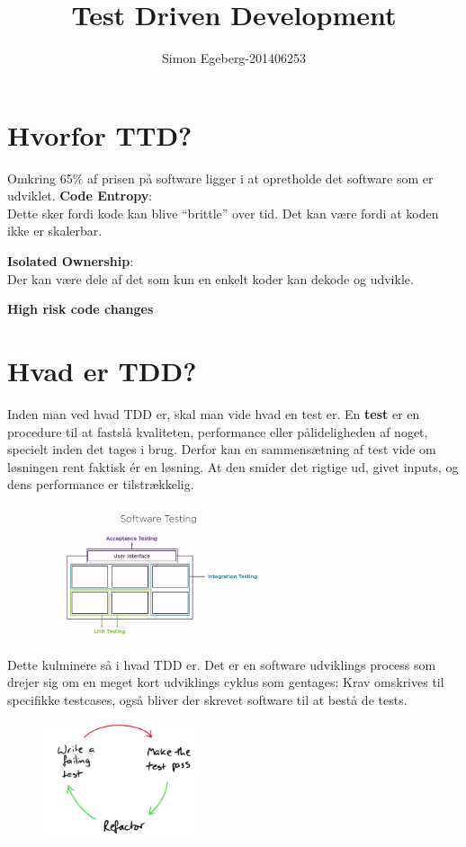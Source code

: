 \documentclass{article}
\title{Test Driven Development}
\author{Simon Egeberg-201406253}
\begin{document}
\maketitle
\section{Hvorfor TTD?}
Omkring 65\% af prisen på software ligger i at opretholde det software som er udviklet.
\textbf{Code Entropy}:\\
Dette sker fordi kode kan blive ``brittle'' over tid. Det kan være fordi at koden ikke er skalerbar.

\textbf{Isolated Ownership}:\\
Der kan være dele af det som kun en enkelt koder kan dekode og udvikle. 

\textbf{High risk code changes}

\section{Hvad er TDD?}
Inden man ved hvad TDD er, skal man vide hvad en test er. En \textbf{test} er en procedure til at fastslå kvaliteten, performance eller pålideligheden af noget, specielt inden det tages i brug.
Derfor kan en sammensætning af test vide om løsningen rent faktisk ér en løsning. At den smider det rigtige ud, givet inputs, og dens performance er tilstrækkelig. \\
\begin{figure}[H]
	\centering
	\includegraphics[width = 0.6\textwidth]{softwaretesting.PNG}
\end{figure}

Dette kulminere så i hvad TDD er. Det er en software udviklings process som drejer sig om en meget kort udviklings cyklus som gentages: Krav omskrives til specifikke testcases, også bliver der skrevet software til at bestå de tests.

\begin{figure}[H]
	\centering
	\includegraphics[width = 0.4\textwidth]{redgreen.PNG}
\end{figure}
\end{document}
